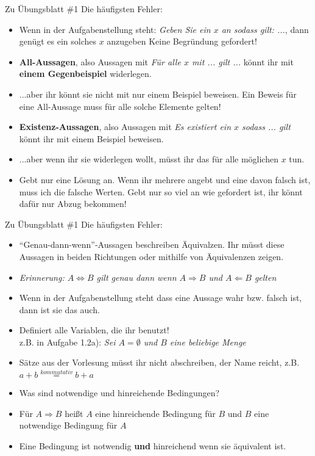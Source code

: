 \begin{frame}{Zu Übungsblatt \#1}
	Die häufigsten Fehler:
	\begin{itemize}[<+->]
		\item Wenn in der Aufgabenstellung steht: \textit{Geben Sie ein $x$ an sodass gilt: ...}, dann genügt es ein solches $x$ anzugeben
		\implitem Keine Begründung gefordert!
		\item \textbf{All-Aussagen}, also Aussagen mit \textit{Für alle $x$ mit ... gilt ...} könnt ihr mit \textbf{einem Gegenbeispiel} widerlegen.
		\item ...aber ihr könnt sie nicht mit nur einem Beispiel beweisen. Ein Beweis für eine All-Aussage muss für alle solche Elemente gelten!
		\item \textbf{Existenz-Aussagen}, also Aussagen mit \textit{Es existiert ein $x$ sodass ... gilt} könnt ihr mit einem Beispiel beweisen.
		\item ...aber wenn ihr sie widerlegen wollt, müsst ihr das für alle möglichen $x$ tun.
		\item Gebt nur eine Lösung an. Wenn ihr mehrere angebt und eine davon falsch ist, muss ich die falsche Werten.
		\implitem Gebt nur so viel an wie gefordert ist, ihr könnt dafür nur Abzug bekommen!
	\end{itemize}
\end{frame}

\begin{frame}{Zu Übungsblatt \#1}
	Die häufigsten Fehler:
	\begin{itemize}[<+->]
		\item ``Genau-dann-wenn''-Aussagen beschreiben Äquivalzen. Ihr müsst diese Aussagen in beiden Richtungen oder mithilfe von Äquivalenzen zeigen.
		\item \textit{Erinnerung: $ A \Leftrightarrow B $ gilt genau dann wenn $A \Rightarrow B$ und $A \Leftarrow B$ gelten}
		\item Wenn in der Aufgabenstellung steht dass eine Aussage wahr bzw. falsch ist, dann ist sie das auch.
		\item Definiert alle Variablen, die ihr benutzt! \\
			z.B. in Aufgabe 1.2a): \textit{Sei $A=\emptyset$ und $B$ eine beliebige Menge}
		\item Sätze aus der Vorlesung müsst ihr nicht abschreiben, der Name reicht, z.B. $ a + b \stackrel{kommutativ}{=} b + a$
		\item Was sind notwendige und hinreichende Bedingungen?
		\item Für $A \Rightarrow B$ heißt $A$ eine hinreichende Bedingung für $B$ und $B$ eine notwendige Bedingung für $A$
		\item Eine Bedingung ist notwendig \textbf{und} hinreichend wenn sie äquivalent ist.
	\end{itemize}
\end{frame}

